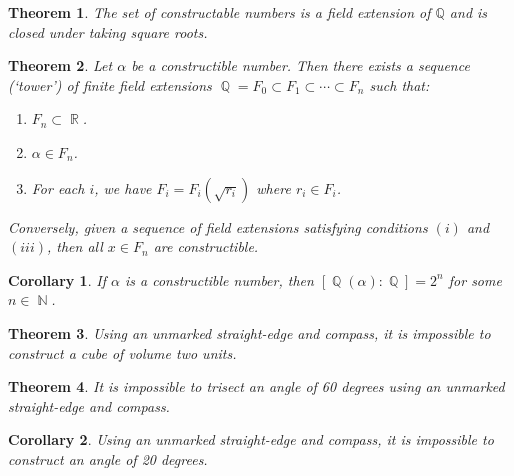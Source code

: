 \documentclass[letterpaper, 12pt]{article}
\DeclareMathOperator{\N}{\mathbb{N}}
\DeclareMathOperator{\Q}{\mathbb{Q}}
\DeclareMathOperator{\R}{\mathbb{R}}
\newtheorem{thm}{Theorem}
\newtheorem{cor}{Corollary}
\begin{document}
		\setcounter{thm}{22}
		\begin{thm}
			The set of constructable numbers is a field extension of $\mathbb{Q}$ and is closed under taking square roots.
		\end{thm}

		\begin{thm}
			Let $\alpha$ be a constructible number.
			Then there exists a sequence (`tower') of finite field extensions $\Q = F_{0} \subset F_{1} \subset \cdots \subset F_{n}$ such that:
			\begin{enumerate}[\hspace*{2.5mm}(i)]
				\item $F_{n} \subset \R$.
				\item $\alpha \in F_{n}$.
				\item For each $i$, we have $F_{i} = F_{i}(\sqrt{r_{i}})$ where $r_{i} \in F_{i}$.
			\end{enumerate}
			Conversely, given a sequence of field extensions satisfying conditions $(i)$ and $(iii)$, then all $x \in F_{n}$ are constructible.
		\end{thm}

		\setcounter{cor}{24}
		\begin{cor}
			If $\alpha$ is a constructible number, then $[\Q(\alpha):\Q] = 2^{n}$ for some $n \in \N$.
		\end{cor}

		\setcounter{thm}{25}
		\begin{thm}
			Using an unmarked straight-edge and compass, it is impossible to construct a cube of volume two units.
		\end{thm}

		\begin{thm}
			It is impossible to trisect an angle of 60 degrees using an unmarked straight-edge and compass.
		\end{thm}

		\setcounter{cor}{27}
		\begin{cor}
			Using an unmarked straight-edge and compass, it is impossible to construct an angle of 20 degrees.
		\end{cor}
\end{document}
